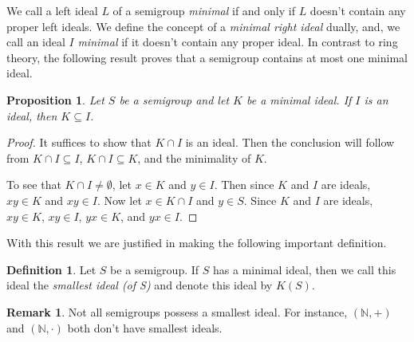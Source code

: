 \documentclass[12pt]{article}
\theoremstyle{plain}
\newtheorem{prop}[thm]{Proposition}
\theoremstyle{definition}
\newtheorem{defn}[thm]{Definition}
\newtheorem{rmk}[thm]{Remark}
\newcommand{\bbN}{\mathbb{N}}
\begin{document}
We call a left ideal $L$ of a semigroup \textsl{minimal} if and only
if $L$ doesn't contain any proper left ideals.
We define the concept of a \textsl{minimal right ideal} dually, and, we
call an ideal $I$ \textsl{minimal} if it doesn't contain any proper
ideal. 
In contrast to ring theory, the following result proves that a
semigroup contains at most one
minimal ideal.

\begin{prop}
  Let $S$ be a semigroup and let $K$ be a minimal ideal.
  If $I$ is an ideal, then $K \subseteq I$.
\end{prop}
\begin{proof}
  It suffices to show that $K \cap I$ is an ideal.  
  Then the conclusion will follow from $K \cap I \subseteq I$, $K\cap
  I \subseteq K$, and the minimality of $K$.

  To see that $K \cap I \ne \emptyset$, let $x \in K$ and $y \in I$.
  Then since $K$ and $I$ are ideals, $xy \in K$ and $xy \in I$.
  Now let $x \in K \cap I$ and $y \in S$.
  Since $K$ and $I$ are ideals, $xy \in K$, $xy \in I$, $yx \in K$,
  and $yx \in I$.
\end{proof}

With this result we are justified in making the following important
definition.
\begin{defn}
  Let $S$ be a semigroup.
  If $S$ has a minimal ideal, then we call this ideal the
  \textsl{smallest ideal (of S)} and denote this ideal by
  $K(S)$. %
\end{defn}
\begin{rmk}
  Not all semigroups possess a smallest ideal.
  For instance, $(\bbN, +)$ and $(\bbN, \cdot)$ both don't have
  smallest ideals. 
\end{rmk}
\end{document}
